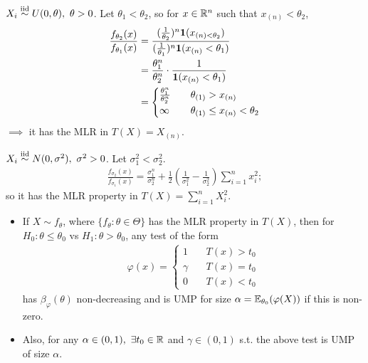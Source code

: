\begin{exap}
	$X_i \SimIID U(0, \theta),\ \theta>0$. Let $\theta_1 < \theta_2$, so for $x \in \mathbb{R}^n$ such that $x_{(n)} < \theta_2$,
	\begin{align*}
		\frac{f_{\theta_2}(x)}{f_{\theta_1} (x)} &= \frac{ (\frac{1}{\theta_2})^n \boldsymbol{1}(x_{(n) < \theta_2 } )}{ (\frac{1}{\theta_1})^n \boldsymbol{1}(x_{(n)} < \theta_1 )} \\
				& = \frac{\theta_1^n}{\theta_2^n} \cdot \frac{1}{\boldsymbol{1}(x_{(n)} < \theta_1)} \\
				& = \begin{cases}
				\frac{\theta_1^n}{\theta_2^n} & \quad \theta_{(1)} > x_{(n)} \\
				\infty & \quad \theta_{(1)} \leq x_{(n)} < \theta_2
				\end{cases}
	\end{align*}
	$\implies$ it has the MLR in $T(X) = X_{(n)}$.
\end{exap}

\begin{exap}
	$X_i \SimIID N(0, \sigma^2),\ \sigma^2>0$. Let $\sigma^2_1 < \sigma^2_2$.
	\begin{align*}
		\frac{f_{\sigma_2}(x)}{f_{\sigma_1} (x)} = \frac{\sigma^n_1}{\sigma_2^n} + \frac{1}{2}( \frac{1}{\sigma_1^2} - \frac{1}{\sigma_2^2} ) \sum_{i=1}^n x_i^2;
	\end{align*}
	so it has the MLR property in $T(X) = \sum_{i=1}^n X_i^2$.
\end{exap}

{\color{blue}
\begin{thm}\textbf{ }
	\begin{itemize}
		\item
		If $X \sim f_\theta$, where $\{ f_\theta: \theta \in \Theta \}$ has the MLR property in $T(X)$, then for $H_0: \theta \leq \theta_0$ vs $H_1: \theta > \theta_0$, any test of the form
		\begin{align*}
		\varphi(x) = \begin{cases}
		1 &\quad T(x) > t_0 \\
		\gamma &\quad T(x) = t_0 \\
		0 &\quad T(x) < t_0
		\end{cases}
		\end{align*}
		has $\beta_\varphi(\theta)$ non-decreasing and is UMP for size $\alpha = \mathbb{E}_{\theta_0} (\varphi(X) )$ if this is non-zero.
		
		
		\item Also, for any $\alpha \in (0,1),\ \exists t_0 \in \RR$ and $\gamma \in (0,1)$ s.t. the above test is UMP of size $\alpha$.
		\end{itemize}
		\end{thm}
	} 

